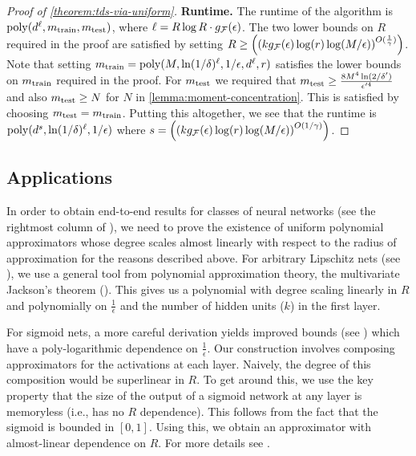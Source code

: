 \documentclass[11pt]{article} %
\numberwithin{equation}{section}
\begin{document}
\begin{proof}[Proof of \cref{theorem:tds-via-uniform}]
    \textbf{Runtime.} The runtime of the algorithm is $\mathrm{poly}(d^\ell, m_{\mathrm{train}}, m_{\mathrm{test}})$, where $\ell = R\log R \cdot g_{\mathcal{F}}(\epsilon)$. The two lower bounds on $R$ required in the proof are satisfied by setting $R \ge \left(\left(kg_{\mathcal{F}}(\epsilon)\log(r)\log(M/\epsilon)\right)^{O(\frac{1}{\gamma})}\right)$. Note that setting $m_{\mathrm{train}} = \mathrm{poly}(M, \ln(1/\delta)^\ell, 1/\epsilon, d^\ell, r)$ satisfies the lower bounds on $m_{\mathrm{train}}$ required in the proof. For $m_{\mathrm{test}}$ we required that $m_{\mathrm{test}} \ge \frac{8M^4 \ln(2/\delta')}{\epsilon'^4}$ and also $m_{\mathrm{test}} \ge N$ for $N$ in \cref{lemma:moment-concentration}. This is satisfied by choosing $m_{\mathrm{test}} = m_{\mathrm{train}}$. Putting this altogether, we see that the runtime is $\mathrm{poly}(d^s, \ln(1/\delta)^\ell, 1/\epsilon)$ where $s =  \left( \left( kg_{\mathcal{F}}(\epsilon) \log(r) \log(M/\epsilon) \right)^{O(1/\gamma)} \right)$.
\end{proof}

\subsection{Applications}

In order to obtain end-to-end results for classes of neural networks (see the rightmost column of ), we need to prove the existence of uniform polynomial approximators whose degree scales almost linearly with respect to the radius of approximation for the reasons described above. For arbitrary Lipschitz nets (see ), we use a general tool from polynomial approximation theory, the multivariate Jackson's theorem (). This gives us a polynomial with degree scaling linearly in $R$ and polynomially on $\frac{1}{\epsilon}$ and the number of hidden units ($k$) in the first layer.

For sigmoid nets, a more careful derivation yields improved bounds (see ) which have a poly-logarithmic dependence on $\frac{1}{\epsilon}$. Our construction involves composing approximators for the activations at each layer. Naively, the degree of this composition would be superlinear in $R$. To get around this, we use the key property that the size of the output of a sigmoid network at any layer is memoryless (i.e., has no $R$ dependence). This follows from the fact that the sigmoid is bounded in $[0,1]$. Using this, we obtain an approximator with almost-linear dependence on $R$. For more details see .

\end{document}
